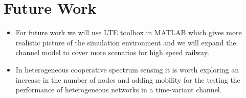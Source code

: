 \section{Future Work}
\begin{itemize}

\item For future work we will use LTE toolbox in MATLAB which gives more realistic picture of the simulation environment and we will expand the channel model to cover more scenarios for high speed railway.

\item In heterogeneous cooperative spectrum sensing it is worth exploring an increase in the number of nodes and adding mobility for the testing the performance of heterogeneous networks in a time-variant channel.

\end{itemize}
